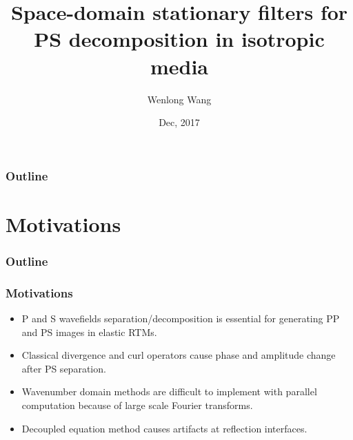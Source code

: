 \documentclass[aspectratio=43]{beamer}
\title[PS decomposition]{Space-domain stationary filters for PS decomposition in isotropic media}
\author[W. Wang]{Wenlong Wang \inst{1}}
\institute[HIT]{\inst{1} Harbin Institute of Technology}
\date[Dec 2017]{Dec, 2017}
\begin{document}


\begin{frame}[plain]
  \titlepage
\end{frame}

\begin{frame}
\frametitle{Outline}
\tableofcontents
\end{frame}
\section{Motivations}
\begin{frame}
\frametitle{Outline}
\tableofcontents[currentsection]
\end{frame}
\begin{frame}
  \frametitle{Motivations}
\begin{itemize}
\item{P and S wavefields separation/decomposition is essential for generating PP and PS images in elastic RTMs.}
\item{Classical divergence and curl operators cause phase and amplitude change after PS separation.}
\item{Wavenumber domain methods are difficult to implement with parallel computation because of large scale Fourier transforms.}
\item{Decoupled equation method causes artifacts at reflection interfaces.}
\end{itemize}
\end{frame}
\end{document}
